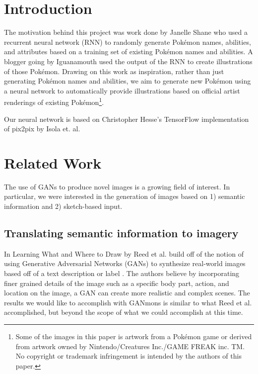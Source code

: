 \documentclass[sigchi]{acmart}
\begin{document}
\maketitle

\section{Introduction}
The motivation behind this project was work done by Janelle Shane who used a recurrent neural network (RNN) to randomly generate Pokémon names, abilities, and attributes based on a training set of existing Pokémon names and abilities. A blogger going by Iguanamouth used the output of the RNN to create illustrations of those Pokémon. Drawing on this work as inspiration, rather than just generating Pokémon names and abilities, we aim to generate new Pokémon using a neural network to automatically provide illustrations based on official artist renderings of existing Pokémon\footnote{Some of the images in this paper is artwork from a Pokémon game or derived from artwork owned by Nintendo/Creatures Inc./GAME FREAK inc. TM. No copyright or trademark infringement is intended by the authors of this paper.}.

Our neural network is based on Christopher Hesse's TensorFlow implementation of pix2pix by Isola et. al. \cite{pix2pix-tensorflow,pix2pix}

\section{Related Work}
The use of GANs to produce novel images is a growing field of interest. In particular, we were interested in the generation of images based on 1) semantic information and 2) sketch-based input.

\subsection{Translating semantic information to imagery}

In Learning What and Where to Draw by Reed et al. build off of the notion of using Generative Adversarial Networks (GANs) to synthesize real-world images based off of a text description or label \cite{whatWhereToDraw}. The authors believe by incorporating finer grained details of the image such as a specific body part, action, and location on the image, a GAN can create more realistic and complex scenes. The results we would like to accomplish with GANmons is similar to what Reed et al. accomplished, but beyond the scope of what we could accomplish at this time.
\end{document}
